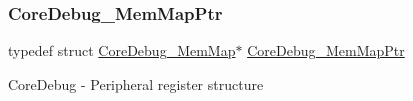 \subsubsection{\texorpdfstring{Core\+Debug\+\_\+\+Mem\+Map\+Ptr}{CoreDebug\_MemMapPtr}}
{\footnotesize\ttfamily typedef struct \hyperlink{struct_core_debug___mem_map}{Core\+Debug\+\_\+\+Mem\+Map}$\ast$ \hyperlink{group___core_debug___peripheral_gaa548220bc91b12bd49065fe752579fcd}{Core\+Debug\+\_\+\+Mem\+Map\+Ptr}}

Core\+Debug -\/ Peripheral register structure 